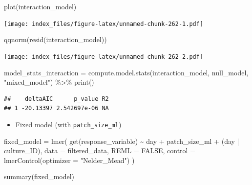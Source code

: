 \documentclass[
]{article}
\newenvironment{Shaded}{\begin{snugshade}}{\end{snugshade}}
\newcommand{\AttributeTok}[1]{\textcolor[rgb]{0.77,0.63,0.00}{#1}}
\newcommand{\ConstantTok}[1]{\textcolor[rgb]{0.00,0.00,0.00}{#1}}
\newcommand{\FunctionTok}[1]{\textcolor[rgb]{0.00,0.00,0.00}{#1}}
\newcommand{\NormalTok}[1]{#1}
\newcommand{\OtherTok}[1]{\textcolor[rgb]{0.56,0.35,0.01}{#1}}
\newcommand{\SpecialCharTok}[1]{\textcolor[rgb]{0.00,0.00,0.00}{#1}}
\newcommand{\StringTok}[1]{\textcolor[rgb]{0.31,0.60,0.02}{#1}}
\providecommand{\tightlist}{%
  \setlength{\itemsep}{0pt}\setlength{\parskip}{0pt}}
\begin{document}
\begin{Shaded}
\begin{Highlighting}[]
\FunctionTok{plot}\NormalTok{(interaction\_model)}
\end{Highlighting}
\end{Shaded}

\texttt{[image: index\_files/figure-latex/unnamed-chunk-262-1.pdf]}

\begin{Shaded}
\begin{Highlighting}[]
\FunctionTok{qqnorm}\NormalTok{(}\FunctionTok{resid}\NormalTok{(interaction\_model))}
\end{Highlighting}
\end{Shaded}

\texttt{[image: index\_files/figure-latex/unnamed-chunk-262-2.pdf]}

\begin{Shaded}
\begin{Highlighting}[]
\NormalTok{model\_stats\_interaction }\OtherTok{=} \FunctionTok{compute.model.stats}\NormalTok{(interaction\_model,}
\NormalTok{                                              null\_model,}
                                              \StringTok{"mixed\_model"}\NormalTok{) }\SpecialCharTok{\%\textgreater{}\%}
  \FunctionTok{print}\NormalTok{()}
\end{Highlighting}
\end{Shaded}

\begin{verbatim}
##    deltaAIC      p_value R2
## 1 -20.13397 2.542697e-06 NA
\end{verbatim}

\begin{itemize}
\tightlist
\item
  Fixed model (with \texttt{patch\_size\_ml})
\end{itemize}

\begin{Shaded}
\begin{Highlighting}[]
\NormalTok{fixed\_model }\OtherTok{=} \FunctionTok{lmer}\NormalTok{(}
  \FunctionTok{get}\NormalTok{(response\_variable) }\SpecialCharTok{\textasciitilde{}}
\NormalTok{    day }\SpecialCharTok{+}
\NormalTok{    patch\_size\_ml }\SpecialCharTok{+}
\NormalTok{    (day }\SpecialCharTok{|}\NormalTok{ culture\_ID),}
  \AttributeTok{data =}\NormalTok{ filtered\_data,}
  \AttributeTok{REML =} \ConstantTok{FALSE}\NormalTok{,}
  \AttributeTok{control =} \FunctionTok{lmerControl}\NormalTok{(}\AttributeTok{optimizer =} \StringTok{"Nelder\_Mead"}\NormalTok{)}
\NormalTok{)}

\FunctionTok{summary}\NormalTok{(fixed\_model)}
\end{Highlighting}
\end{Shaded}
\end{document}
